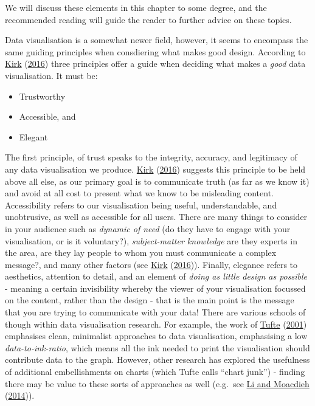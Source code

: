 \documentclass[
]{book}
\providecommand{\tightlist}{%
  \setlength{\itemsep}{0pt}\setlength{\parskip}{0pt}}
\begin{document}
We will discuss these elements in this chapter to some degree, and the recommended reading will guide the reader to further advice on these topics.

Data visualisation is a somewhat newer field, however, it seems to encompass the same guiding principles when consdiering what makes good design. According to \protect\hyperlink{ref-Kirk_2016}{Kirk} (\protect\hyperlink{ref-Kirk_2016}{2016}) three principles offer a guide when deciding what makes a \emph{good} data visualisation. It must be:

\begin{itemize}
\tightlist
\item
  Trustworthy
\item
  Accessible, and
\item
  Elegant
\end{itemize}

The first principle, of trust speaks to the integrity, accuracy, and legitimacy of any data visualisation we produce. \protect\hyperlink{ref-Kirk_2016}{Kirk} (\protect\hyperlink{ref-Kirk_2016}{2016}) suggests this principle to be held above all else, as our primary goal is to communicate truth (as far as we know it) and avoid at all cost to present what we know to be misleading content. Accessibility refers to our visualisation being useful, understandable, and unobtrusive, as well as accessible for all users. There are many things to consider in your audience such as \emph{dynamic of need} (do they have to engage with your visualisation, or is it voluntary?), \emph{subject-matter knowledge} are they experts in the area, are they lay people to whom you must communicate a complex message?, and many other factors (see \protect\hyperlink{ref-Kirk_2016}{Kirk} (\protect\hyperlink{ref-Kirk_2016}{2016})). Finally, elegance refers to aesthetics, attention to detail, and an element of \emph{doing as little design as possible} - meaning a certain invisibility whereby the viewer of your visualisation focussed on the content, rather than the design - that is the main point is the message that you are trying to communicate with your data! There are various schools of though within data visualisation research. For example, the work of \protect\hyperlink{ref-Tufte_2001}{Tufte} (\protect\hyperlink{ref-Tufte_2001}{2001}) emphasises clean, minimalist approaches to data visualisation, emphasising a low \emph{data-to-ink-ratio}, which means all the ink needed to print the visualisation should contribute data to the graph. However, other research has explored the usefulness of additional embellishments on charts (which Tufte calls ``chart junk'') - finding there may be value to these sorts of approaches as well (e.g.~see \protect\hyperlink{ref-Li_2014}{Li and Moacdieh} (\protect\hyperlink{ref-Li_2014}{2014})).
\end{document}
